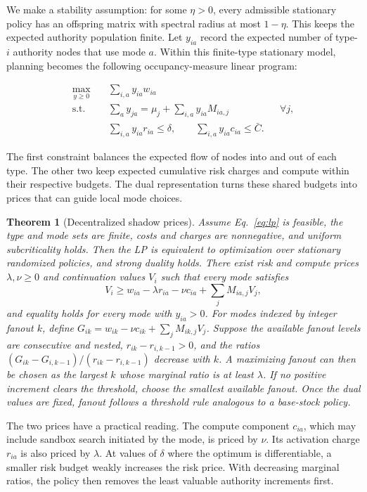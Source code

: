 \documentclass[sigconf,nonacm]{acmart}
\newtheorem{theorem}{Theorem}
\begin{document}
We make a stability assumption: for some $\eta>0$, every admissible stationary policy has an
offspring matrix with spectral radius at most $1-\eta$.  This keeps the expected authority
population finite.  Let $y_{ia}$ record the expected number of type-$i$ authority nodes that use
mode $a$.  Within this finite-type stationary model, planning becomes the following
occupancy-measure linear program:

\begin{equation}
\begin{aligned}
 \max_{y\geq0}\quad &\sum_{i,a}y_{ia}w_{ia}\\
 \text{s.t.}\quad
 &\sum_a y_{ja}=\mu_j+\sum_{i,a}y_{ia}M_{ia,j} &&\forall j,\\
 &\sum_{i,a}y_{ia}r_{ia}\leq\delta,\qquad
 \sum_{i,a}y_{ia}c_{ia}\leq\bar C .
\end{aligned}
\label{eq:lp}
\end{equation}

The first constraint balances the expected flow of nodes into and out of each type.  The other
two keep expected cumulative risk charges and compute within their respective budgets.  The dual
representation turns these shared budgets into prices that can guide local mode choices.

\begin{theorem}[Decentralized shadow prices]
Assume Eq.~\eqref{eq:lp} is feasible, the type and mode sets are finite, costs and charges are
nonnegative, and uniform subcriticality holds.  Then the LP is equivalent to optimization over
stationary randomized policies, and strong duality holds.  There exist risk and compute prices
$\lambda,\nu\geq0$ and continuation values $V_i$ such that every mode satisfies
\[
 V_i\geq w_{ia}-\lambda r_{ia}-\nu c_{ia}+\sum_jM_{ia,j}V_j ,
\]
and equality holds for every mode with $y_{ia}>0$.  For modes indexed by integer fanout $k$,
define $G_{ik}=w_{ik}-\nu c_{ik}+\sum_jM_{ik,j}V_j$.  Suppose the available fanout levels are
consecutive and nested, $r_{ik}-r_{i,k-1}>0$, and the ratios
$(G_{ik}-G_{i,k-1})/(r_{ik}-r_{i,k-1})$ decrease with $k$.  A maximizing fanout can then be chosen
as the largest $k$ whose marginal ratio is at least $\lambda$.  If no positive increment clears
the threshold, choose the smallest available fanout.  Once the dual values are fixed, fanout
follows a threshold rule analogous to a base-stock policy.
\end{theorem}

The two prices have a practical reading.  The compute component $c_{ia}$, which may include
sandbox search initiated by the mode, is priced by $\nu$.  Its activation charge $r_{ia}$ is also
priced by $\lambda$.  At values of
$\delta$ where the optimum is differentiable, a smaller risk budget weakly increases the risk
price.  With decreasing marginal ratios, the policy then removes the least valuable authority
increments first.
\end{document}
